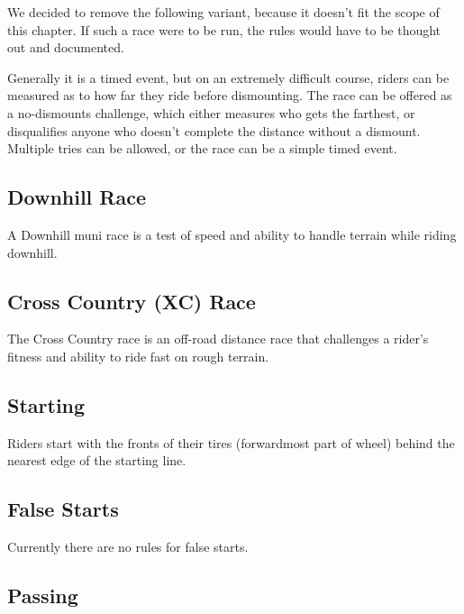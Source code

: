 \begin{comment2016}
We decided to remove the following variant, because it doesn't fit the scope of this chapter.
If such a race were to be run, the rules would have to be thought out and documented.

Generally it is a timed event, but on an extremely difficult course, riders can be measured as to how far they ride before dismounting.
The race can be offered as a no-dismounts challenge, which either measures who gets the farthest, or disqualifies anyone who doesn't complete the distance without a dismount.
Multiple tries can be allowed, or the race can be a simple timed event.
\end{comment2016}

\subsection{Downhill Race \label{sec:muni_downhill}}

A Downhill muni race is a test of speed and ability to handle terrain while riding downhill.

\subsection{Cross Country (XC) Race\label{sec:muni_xc}}

The Cross Country race is an off-road distance race that challenges a rider's fitness and ability to ride fast on rough terrain.

\subsection{Starting}

Riders start with the fronts of their tires (forwardmost part of wheel) behind the nearest edge of the starting line.

\begin{comment2016}
\subsection{False Starts}

Currently there are no rules for false starts.
\end{comment2016}

\subsection{Passing}

